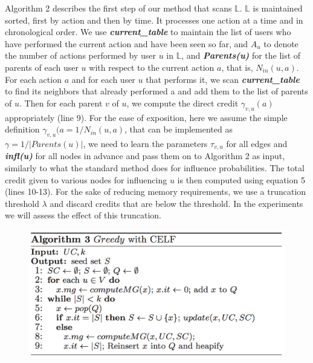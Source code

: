 \documentclass{acm_proc_article-sp}
\begin{document}
Algorithm 2 describes the first step of our method that scans $\mathbb{L}$. $\mathbb{L}$ is maintained sorted, first by action and then by time. It processes one action at a time and in chronological order. We use \textit{\textbf{current\_table} }to maintain the list of users who have performed the current action and have been seen so far, and $A_u$ to denote the number of actions performed by user $u$ in $\mathbb{L}$, and\textbf{ \textit{Parents(u)} }for the list of parents of each user $u$ with respect to the current action $a$, that is, $N_{in}(u, a)$. For each action $a$ and for each user $u$ that performs it, we scan \textbf{\textit{current\_table}} to find its neighbors that already performed a and add them to the list of parents of $u$. Then for each parent $v$ of $u$, we compute the direct credit $\gamma_{v,u}(a)$ appropriately (line 9). For the ease of exposition, here we assume the simple definition $\gamma_{v,u}(a = 1/N_{in}(u,a)$, that can be implemented as $\gamma = 1/|Parents(u)|$, we need to learn the parameters $\tau_{v,u}$ for all edges and \textit{\textbf{infl(u)}} for all nodes in advance and pass them on to Algorithm 2 as input, similarly to what the standard method does for influence probabilities. The total credit given to various nodes for influencing $u$ is then computed using equation 5 (lines 10-13). For the sake of reducing memory requirements, we use a truncation threshold $\lambda$ and discard credits that are below the threshold. In the experiments we will assess the effect of this truncation.
\begin{figure}
	\includegraphics[scale=0.4]{al3.png}
	\centering
	\label{al3}
\end{figure}
\end{document}

